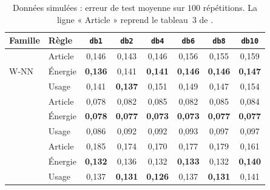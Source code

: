 \begin{table}[ht]
\centering
\small
\begin{tabular}{@{}llcccccc@{}}
\toprule
Famille & Règle & \texttt{db1} & \texttt{db2} & \texttt{db4} & \texttt{db6} & \texttt{db8} & \texttt{db10} \\
\midrule
\multirow{3}{*}{W-NN} & Article & 0{,}146 & 0{,}143 & 0{,}146 & 0{,}156 & 0{,}155 & 0{,}159 \\
 & Énergie & \textbf{0{,}136} & 0{,}141 & \textbf{0{,}141} & \textbf{0{,}146} & \textbf{0{,}146} & \textbf{0{,}147} \\
 & Usage & 0{,}141 & \textbf{0{,}137} & 0{,}151 & 0{,}149 & 0{,}147 & 0{,}154 \\
\addlinespace
\multirow{3}{*}{W-QDA} & Article & 0{,}078 & 0{,}082 & 0{,}085 & 0{,}082 & 0{,}085 & 0{,}084 \\
 & Énergie & \textbf{0{,}078} & \textbf{0{,}077} & \textbf{0{,}073} & \textbf{0{,}073} & \textbf{0{,}077} & \textbf{0{,}077} \\
 & Usage & 0{,}086 & 0{,}092 & 0{,}092 & 0{,}093 & 0{,}097 & 0{,}097 \\
\addlinespace
\multirow{3}{*}{W-CART} & Article & 0{,}185 & 0{,}174 & 0{,}170 & 0{,}177 & 0{,}179 & 0{,}161 \\
 & Énergie & \textbf{0{,}132} & 0{,}136 & 0{,}132 & \textbf{0{,}133} & 0{,}132 & \textbf{0{,}140} \\
 & Usage & 0{,}137 & \textbf{0{,}131} & \textbf{0{,}126} & 0{,}137 & \textbf{0{,}131} & 0{,}141 \\
\bottomrule
\end{tabular}

\caption{Données simulées : erreur de test moyenne sur $100$ répétitions. La ligne « Article » reprend le tableau~3 de \citet{berlinet2008functional}.}
\label{tab-simulation-bases}
\end{table}

